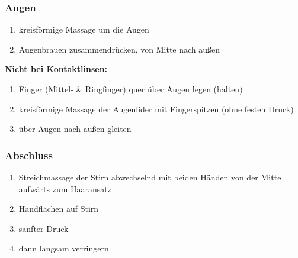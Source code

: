 \subsubsection{Augen}
\begin{enumerate}
\item kreisförmige Massage um die Augen
\item Augenbrauen zusammendrücken, von Mitte nach außen
\end{enumerate}

\textbf{Nicht bei Kontaktlinsen:}
\begin{enumerate}
\item Finger (Mittel- \& Ringfinger) quer über Augen legen (halten)
\item kreisförmige Massage der Augenlider mit Fingerspitzen (ohne festen Druck)
\item über Augen nach außen gleiten
\end{enumerate}

\subsubsection{Abschluss}
\begin{enumerate}
\item Streichmassage der Stirn abwechselnd mit beiden Händen von der Mitte aufwärts zum Haaransatz
\item Handflächen auf Stirn
\item sanfter Druck
\item dann langsam verringern
\end{enumerate}
